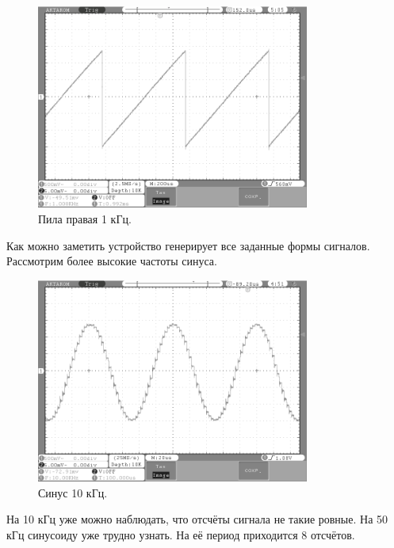 	\begin{figure}[H]
    \centering
    \includegraphics[width=0.8\textwidth]{../image/r_saw1.bmp}
    \caption{Пила правая 1 кГц.}
	\end{figure}	
	
	Как можно заметить устройство генерирует все заданные формы сигналов. Рассмотрим более высокие частоты синуса.
	
	\begin{figure}[H]
    \centering
    \includegraphics[width=0.8\textwidth]{../image/sin10.bmp}
    \caption{Синус 10 кГц.}
	\end{figure}	
	
	На 10 кГц уже можно наблюдать, что отсчёты сигнала не такие ровные. На 50 кГц синусоиду уже трудно узнать. На её период приходится 8 отсчётов.
	

